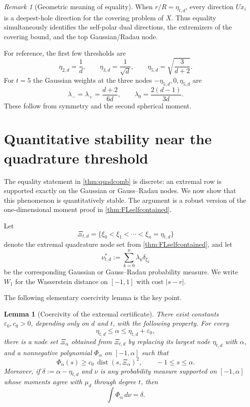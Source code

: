\documentclass[11pt]{amsart}
\newtheorem{lemma}[theorem]{Lemma}
\theoremstyle{definition}
\theoremstyle{remark}
\newtheorem{remark}[theorem]{Remark}
\begin{document}
\begin{remark}[Geometric meaning of equality]
When $r/R=\eta_{t,d}$, every direction $Ux_i$ is a deepest-hole direction for the covering problem of $X$.  Thus equality simultaneously identifies the self-polar dual directions, the extremizers of the covering bound, and the top Gaussian/Radau node.
\end{remark}

For reference, the first few thresholds are
\begin{equation}\label{eq:smallthresholds}
 \eta_{2,d}=\frac1d,
 \qquad
 \eta_{3,d}=\frac1{\sqrt d},
 \qquad
 \eta_{5,d}=\sqrt{\frac3{d+2}}.
\end{equation}
For $t=5$ the Gaussian weights at the three nodes
$-\eta_{5,d},0,\eta_{5,d}$ are
\begin{equation}\label{eq:t5weights}
 \lambda_- =\lambda_+=\frac{d+2}{6d},
 \qquad
 \lambda_0=\frac{2(d-1)}{3d}.
\end{equation}
These follow from symmetry and the second spherical moment.


\section{Quantitative stability near the quadrature threshold}
\label{sec:stability}

The equality statement in \cref{thm:quadcomb} is discrete: an extremal row is supported exactly on the Gaussian or Gauss--Radau nodes.  We now show that this phenomenon is quantitatively stable.  The argument is a robust version of the one-dimensional moment proof in \cref{thm:FLselfcontained}.

Let
\[
 \Xi_{t,d}=\{\xi_0<\xi_1<\cdots<\xi_n=\eta_{t,d}\}
\]
denote the extremal quadrature node set from \cref{thm:FLselfcontained}, and let
\[
 \nu_{t,d}^*:=\sum_{k=0}^n\lambda_k\delta_{\xi_k}
\]
be the corresponding Gaussian or Gauss--Radau probability measure.  We write $W_1$ for the Wasserstein distance on $[-1,1]$ with cost $|s-r|$.

The following elementary coercivity lemma is the key point.

\begin{lemma}[Coercivity of the extremal certificate]\label{lem:certificate-coercive}
There exist constants $\varepsilon_0,c_0>0$, depending only on $d$ and $t$, with the following property.  For every
\[
 \eta_{t,d}\le\alpha\le\eta_{t,d}+\varepsilon_0,
\]
there is a node set $\Xi_\alpha$ obtained from $\Xi_{t,d}$ by replacing its largest node $\eta_{t,d}$ with $\alpha$, and a nonnegative polynomial $\Phi_\alpha$ on $[-1,\alpha]$ such that
\begin{equation}\label{eq:certificate-coercive}
 \Phi_\alpha(s)\ge c_0\,\operatorname{dist}(s,\Xi_\alpha)^2,
 \qquad -1\le s\le\alpha.
\end{equation}
Moreover, if $\delta:=\alpha-\eta_{t,d}$ and $\nu$ is any probability measure supported on $[-1,\alpha]$ whose moments agree with $\mu_d$ through degree $t$, then
\begin{equation}\label{eq:certificate-defect}
 \int\Phi_\alpha\,d\nu=\delta.
\end{equation}
\end{lemma}
\end{document}
